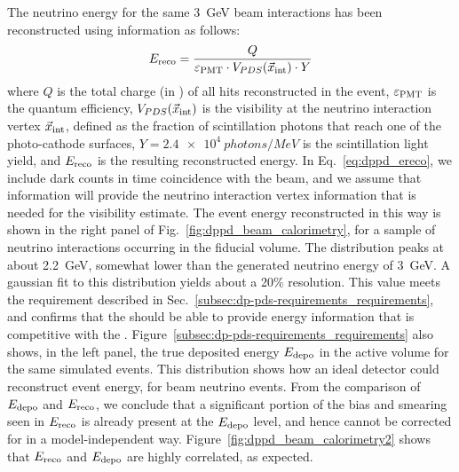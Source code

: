 The neutrino energy for the same \SI{3}{\GeV} beam \nue {} interactions has been reconstructed using  information as follows:
%
\begin{equation}
\label{eq:dppd_ereco} 
E_{\rm reco} = \frac{Q}{\varepsilon_{\rm PMT}\cdot V_{PDS}(\vec{x}_{\rm int})\cdot Y}
\end{equation}
%
\noindent where $Q$ is the total charge (in ) of all  hits reconstructed in the event, $\varepsilon_{\rm PMT}$ is the  quantum efficiency, $V_{PDS}(\vec{x}_{\rm int})$ is the  visibility at the neutrino interaction vertex $\vec{x}_{\rm int}$, defined as the fraction of \lar scintillation photons that reach one of the  photo-cathode surfaces, $Y=\SI{2.4e4}{photons/MeV}$ is the scintillation light yield, and $E_{\rm reco}$ is the resulting reconstructed energy. In Eq.~\ref{eq:dppd_ereco}, we include  dark counts in time coincidence with the beam, and we assume that  information will provide the neutrino interaction vertex information that is needed for the visibility estimate. The event energy reconstructed in this way is shown in the right panel of Fig.~\ref{fig:dppd_beam_calorimetry}, for a sample of neutrino interactions occurring in the \lar fiducial volume. The distribution peaks at about \SI{2.2}{GeV}, somewhat lower than the generated neutrino energy of \SI{3}{GeV}. A gaussian fit to this distribution yields about a \num{20}\% resolution. This value meets the requirement described in Sec.~\ref{subsec:dp-pds-requirements_requirements}, and confirms that the  should be able to provide energy information that is competitive with the \dune {}. Figure~\ref{subsec:dp-pds-requirements_requirements} also shows, in the left panel, the true deposited energy $E_{\rm depo}$ in the \lar active volume for the same simulated events. This distribution shows how an ideal detector could reconstruct event energy, for beam neutrino events. From the comparison of $E_{\rm depo}$ and $E_{\rm reco}$, we conclude that a significant portion of the bias and smearing seen in $E_{\rm reco}$ is already present at the $E_{\rm depo}$ level, and hence cannot be corrected for in a model-independent way. Figure~\ref{fig:dppd_beam_calorimetry2} shows that $E_{\rm reco}$ and $E_{\rm depo}$ are highly correlated, as expected. 

